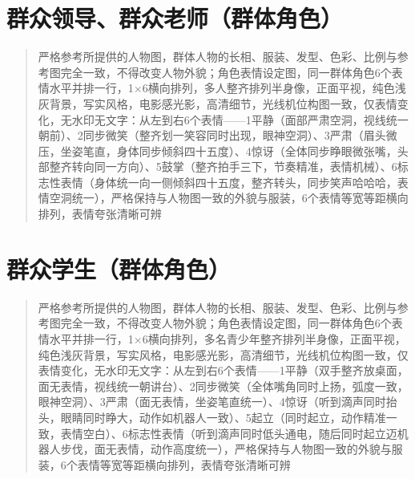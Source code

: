 \documentclass[11pt, a4paper]{article}
\begin{document}
	\section{群众领导、群众老师（群体角色）}
	
	\begin{quote}
		\small
		严格参考所提供的人物图，群体人物的长相、服装、发型、色彩、比例与参考图完全一致，不得改变人物外貌；角色表情设定图，同一群体角色6个表情水平并排一行，1×6横向排列，多人整齐排列半身像，正面平视，纯色浅灰背景，写实风格，电影感光影，高清细节，光线机位构图一致，仅表情变化，无水印无文字：从左到右6个表情——1平静（面部严肃空洞，视线统一朝前）、2同步微笑（整齐划一笑容同时出现，眼神空洞）、3严肃（眉头微压，坐姿笔直，身体同步倾斜四十五度）、4惊讶（全体同步睁眼微张嘴，头部整齐转向同一方向）、5鼓掌（整齐拍手三下，节奏精准，表情机械）、6标志性表情（身体统一向一侧倾斜四十五度，整齐转头，同步笑声哈哈哈，表情空洞统一），严格保持与人物图一致的外貌与服装，6个表情等宽等距横向排列，表情夸张清晰可辨
	\end{quote}
	
	\section{群众学生（群体角色）}
	
	\begin{quote}
		\small
		严格参考所提供的人物图，群体人物的长相、服装、发型、色彩、比例与参考图完全一致，不得改变人物外貌；角色表情设定图，同一群体角色6个表情水平并排一行，1×6横向排列，多名青少年整齐排列半身像，正面平视，纯色浅灰背景，写实风格，电影感光影，高清细节，光线机位构图一致，仅表情变化，无水印无文字：从左到右6个表情——1平静（双手整齐放桌面，面无表情，视线统一朝讲台）、2同步微笑（全体嘴角同时上扬，弧度一致，眼神空洞）、3严肃（面无表情，坐姿笔直统一）、4惊讶（听到滴声同时抬头，眼睛同时睁大，动作如机器人一致）、5起立（同时起立，动作精准一致，表情空白）、6标志性表情（听到滴声同时低头通电，随后同时起立迈机器人步伐，面无表情，动作高度统一），严格保持与人物图一致的外貌与服装，6个表情等宽等距横向排列，表情夸张清晰可辨
	\end{quote}
	
\end{document}

